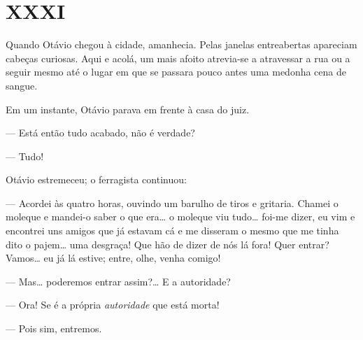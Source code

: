 {%

\section{XXXI}


Quando Otávio chegou à cidade, amanhecia.
Pelas janelas entreabertas apareciam cabeças curiosas. Aqui e acolá, um
mais afoito atrevia-se a atravessar a rua ou a seguir mesmo até o lugar
em que se passara pouco antes uma medonha cena de sangue.

Em um instante, Otávio parava em frente à casa
do juiz.



--- Está então tudo acabado, não é verdade?

--- Tudo!

Otávio estremeceu; o ferragista continuou:

--- Acordei às quatro horas, ouvindo um barulho de
tiros e gritaria. Chamei o moleque e mandei-o saber o que era\ldots{} o
moleque viu tudo\ldots{} foi-me dizer, eu vim e encontrei uns amigos que
já estavam cá e me disseram o mesmo que me tinha dito o
pajem\ldots{} uma desgraça! Que hão de dizer de nós lá
fora! Quer entrar? Vamos\ldots{} eu já lá estive; entre, olhe,
venha comigo!

--- Mas\ldots{} poderemos entrar assim?\ldots{} E a autoridade?

--- Ora! Se é a própria \emph{autoridade} que está
morta!

--- Pois sim, entremos.


}
